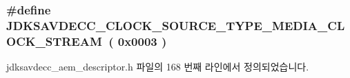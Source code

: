 \subsubsection[{\texorpdfstring{J\+D\+K\+S\+A\+V\+D\+E\+C\+C\+\_\+\+C\+L\+O\+C\+K\+\_\+\+S\+O\+U\+R\+C\+E\+\_\+\+T\+Y\+P\+E\+\_\+\+M\+E\+D\+I\+A\+\_\+\+C\+L\+O\+C\+K\+\_\+\+S\+T\+R\+E\+AM}{JDKSAVDECC_CLOCK_SOURCE_TYPE_MEDIA_CLOCK_STREAM}}]{\setlength{\rightskip}{0pt plus 5cm}\#define J\+D\+K\+S\+A\+V\+D\+E\+C\+C\+\_\+\+C\+L\+O\+C\+K\+\_\+\+S\+O\+U\+R\+C\+E\+\_\+\+T\+Y\+P\+E\+\_\+\+M\+E\+D\+I\+A\+\_\+\+C\+L\+O\+C\+K\+\_\+\+S\+T\+R\+E\+AM~( 0x0003 )}\hypertarget{group__clock__source__type_ga68e7086ebb51a44ed70f8066a9c5ba6c}{}\label{group__clock__source__type_ga68e7086ebb51a44ed70f8066a9c5ba6c}


jdksavdecc\+\_\+aem\+\_\+descriptor.\+h 파일의 168 번째 라인에서 정의되었습니다.

